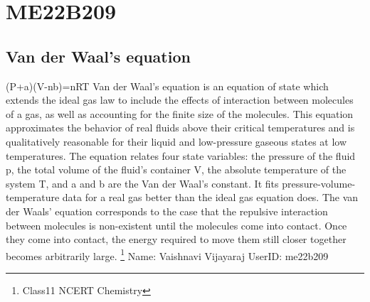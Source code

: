 \section{ME22B209}
\subsection{Van der Waal's equation}
(P+a)(V-nb)=nRT
Van der Waal's equation is an equation of state which extends the ideal gas law to include the effects of interaction between molecules of a gas, as well as accounting for the finite size of the molecules.
This equation approximates the behavior of real fluids above their critical temperatures and is qualitatively reasonable for their liquid and low-pressure gaseous states at low temperatures.
The equation relates four state variables: the pressure of the fluid p, the total volume of the fluid's container V, the absolute temperature of the system T, and a and b are the Van der Waal's constant.
It fits pressure-volume-temperature data for a real gas better than the ideal gas equation does.
The van der Waals’ equation corresponds to the case that the repulsive interaction between molecules is non-existent until the molecules come into contact. 
Once they come into contact, the energy required to move them still closer together becomes arbitrarily large.
\footnote{Class11 NCERT Chemistry}
Name: Vaishnavi Vijayaraj
UserID: me22b209
